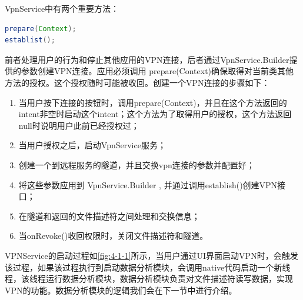 \documentclass[format=final, language=chinese, degree=fyp]{hustthesis}
\begin{document}
VpnService中有两个重要方法：

\begin{lstlisting}[language=Java]
prepare(Context);
establist();
\end{lstlisting}

前者处理用户的行为和停止其他应用的VPN连接，后者通过VpnService.Builder提供的参数创建VPN连接。应用必须调用 prepare(Context)确保取得对当前类其他方法的授权。这个授权随时可能被收回。创建一个VPN连接的步骤如下：
 \begin{enumerate}
     \item 当用户按下连接的按钮时，调用prepare(Context)，并且在这个方法返回的intent非空时启动这个intent；这个方法为了取得用户的授权，这个方法返回null时说明用户此前已经授权过；
     \item 当用户授权之后，启动VpnService服务；
     \item 创建一个到远程服务的隧道，并且交换vpn连接的参数并配置好；
     \item 将这些参数应用到 VpnService.Builder , 并通过调用establish()创建VPN接口；
     \item 在隧道和返回的文件描述符之间处理和交换信息；
     \item 当onRevoke()收回权限时，关闭文件描述符和隧道。
\end{enumerate}

VPNService的启动过程如\autoref{fig:4-1-1}所示，当用户通过UI界面启动VPN时，会触发该过程，如果该过程执行到启动数据分析模块，会调用native代码启动一个新线程，该线程运行数据分析模块，数据分析模块负责对文件描述符读写数据，实现VPN的功能。数据分析模块的逻辑我们会在下一节中进行介绍。
\end{document}
